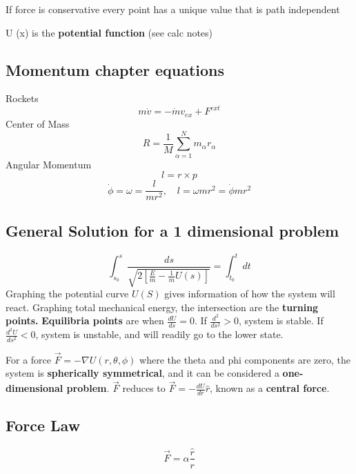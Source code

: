 \hfill
\hfill

If force is conservative every point has a unique value that is path independent

U (x) is the \textbf{potential function} (see calc notes)

\subsection{Momentum chapter equations}
Rockets
\begin{equation}
	\label{}
	m\dot{v}=-\dot{m}v_{ex}+F^{ext}
\end{equation}
Center of Mass
\begin{equation}
	\label{}
	R=\frac{1}{M}\sum_{\alpha=1}^{N}m_{\alpha}r_{\alpha}
\end{equation}
Angular Momentum
\begin{equation}
	\label{}
	l=r \times p
\end{equation}
\begin{equation}
	\label{}
	\dot{\phi}=\omega=\frac{l}{mr^{2}},\quad l=\omega mr^{2}=\dot{\phi}mr^{2}
\end{equation}


\subsection{General Solution for a 1 dimensional problem}
\begin{equation}
	\label{}
	\int_{s_{0}}^{s}\frac{ds}{\sqrt{2[\frac{E}{m}-\frac{1}{m}U(s)]}}=\int_{t_{0}}^{t}dt
\end{equation}
Graphing the potential curve $U(S)$ gives information of how the system will react. Graphing total mechanical energy, the intersection are the \textbf{turning points.} \textbf{Equilibria points} are when $\frac{dU}{ds}=0$.
If $\frac{d^{2}}{ds^{2}}>0$, system is stable. If $\frac{d^{2}U}{ds^{2}}<0$, system is unstable, and will readily go to the lower state.

\hfill
\hfill

For a force $\vec{F}=-\nabla U(r,\theta,\phi)$ where the theta and phi components are zero, the system is \textbf{spherically symmetrical}, and it can be considered a \textbf{one-dimensional problem}. $\vec{F}$ reduces to $\vec{F}=-\frac{dU}{dr}\hat{r}$, known as a \textbf{central force}. 

\subsection{Force Law}
\begin{equation}
	\label{}
	\vec{F}=\alpha \frac{\hat{r}}{r}
\end{equation}


